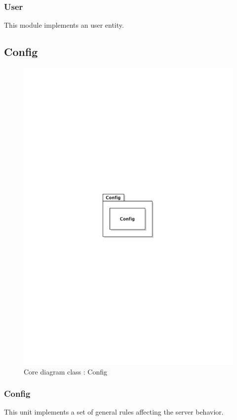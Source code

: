 		\subsubsection{User}
			This module implements an user entity.
\newpage
	\subsection{Config}
		\begin{figure}[ht]
			\begin{center}
				\includegraphics[width=\textwidth,  trim=2cm 12cm 2cm 12cm]{UML_figure/DC/core/config/DC_Config.pdf}
				\caption{Core diagram class : Config}
			\end{center}
		\end{figure}
		\subsubsection{Config}
			This unit implements a set of general rules affecting the server behavior.
